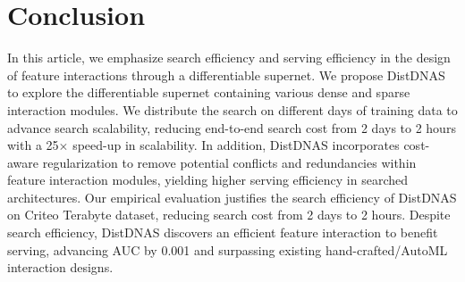 \section{Conclusion}
In this article, we emphasize search efficiency and serving efficiency in the design of feature interactions through a differentiable supernet. 
We propose DistDNAS to explore the differentiable supernet containing various dense and sparse interaction modules.
We distribute the search on different days of training data to advance search scalability, reducing end-to-end search cost from 2 days to 2 hours with a 25$\times$ speed-up in scalability.
In addition, DistDNAS incorporates cost-aware regularization to remove potential conflicts and redundancies within feature interaction modules, yielding higher serving efficiency in searched architectures.
Our empirical evaluation justifies the search efficiency of DistDNAS on Criteo Terabyte dataset, reducing search cost from 2 days to 2 hours.
Despite search efficiency, DistDNAS discovers an efficient feature interaction to benefit serving, advancing AUC by 0.001 and surpassing existing hand-crafted/AutoML interaction designs.